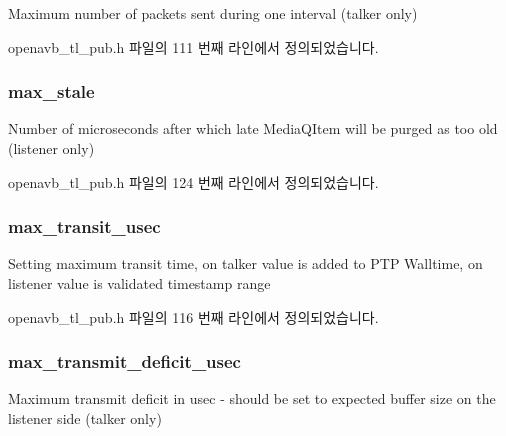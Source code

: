 Maximum number of packets sent during one interval (talker only) 



openavb\+\_\+tl\+\_\+pub.\+h 파일의 111 번째 라인에서 정의되었습니다.

\subsubsection[{\texorpdfstring{max\+\_\+stale}{max_stale}}]{ max\+\_\+stale}\hypertarget{structopenavb__tl__cfg__t_aea5235cb82456b3c3285f5f6910dd4dc}{}\label{structopenavb__tl__cfg__t_aea5235cb82456b3c3285f5f6910dd4dc}
Number of microseconds after which late Media\+Q\+Item will be purged as too old (listener only) 

openavb\+\_\+tl\+\_\+pub.\+h 파일의 124 번째 라인에서 정의되었습니다.

\subsubsection[{\texorpdfstring{max\+\_\+transit\+\_\+usec}{max_transit_usec}}]{ max\+\_\+transit\+\_\+usec}\hypertarget{structopenavb__tl__cfg__t_a0980bddad549fb206164677f8095d44b}{}\label{structopenavb__tl__cfg__t_a0980bddad549fb206164677f8095d44b}
Setting maximum transit time, on talker value is added to P\+TP Walltime, on listener value is validated timestamp range 

openavb\+\_\+tl\+\_\+pub.\+h 파일의 116 번째 라인에서 정의되었습니다.

\subsubsection[{\texorpdfstring{max\+\_\+transmit\+\_\+deficit\+\_\+usec}{max_transmit_deficit_usec}}]{ max\+\_\+transmit\+\_\+deficit\+\_\+usec}\hypertarget{structopenavb__tl__cfg__t_adca8d3921ed9e2b689df1e37ffaf1a3d}{}\label{structopenavb__tl__cfg__t_adca8d3921ed9e2b689df1e37ffaf1a3d}
Maximum transmit deficit in usec -\/ should be set to expected buffer size on the listener side (talker only) 

